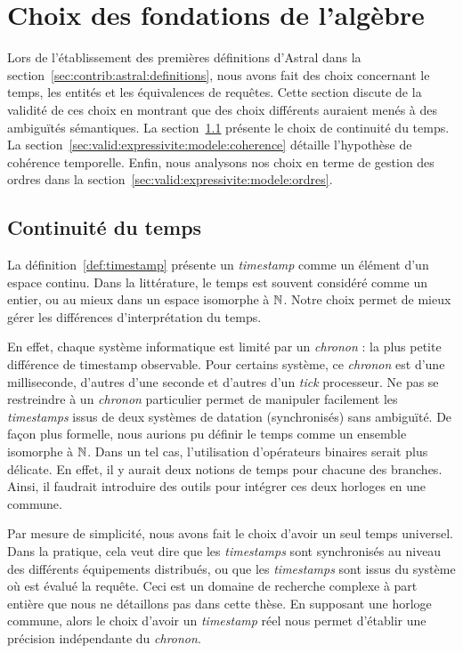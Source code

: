 \section{Choix des fondations de l'algèbre}\label{sec:valid:expressivite:modele}
Lors de l'établissement des premières définitions d'Astral dans la section~\ref{sec:contrib:astral:definitions}, nous avons fait des choix concernant le temps, les entités et les équivalences de requêtes. Cette section discute de la validité de ces choix en montrant que des choix différents auraient menés à des ambiguïtés sémantiques. La section~\ref{sec:valid:expressivite:modele:temps} présente le choix de continuité du temps. La section~\ref{sec:valid:expressivite:modele:coherence} détaille l'hypothèse de cohérence temporelle. Enfin, nous analysons nos choix en terme de gestion des ordres dans la section~\ref{sec:valid:expressivite:modele:ordres}.

\subsection{Continuité du temps}\label{sec:valid:expressivite:modele:temps}
La définition~\ref{def:timestamp} présente un \textit{timestamp} comme un élément d'un espace continu. Dans la littérature, le temps est souvent considéré comme un entier, ou au mieux dans un espace isomorphe à $\mathbb{N}$. Notre choix permet de mieux gérer les différences d'interprétation du temps.

En effet, chaque système informatique est limité par un \textit{chronon} : la plus petite différence de timestamp observable. Pour certains système, ce \textit{chronon} est d'une milliseconde, d'autres d'une seconde et d'autres d'un \textit{tick} processeur. Ne pas se restreindre à un \textit{chronon} particulier permet de manipuler facilement les \textit{timestamps} issus de deux systèmes de datation (synchronisés) sans ambiguïté. De façon plus formelle, nous aurions pu définir le temps comme un ensemble isomorphe à $\mathbb{N}$. Dans un tel cas, l'utilisation d'opérateurs binaires serait plus délicate. En effet, il y aurait deux notions de temps pour chacune des branches. Ainsi, il faudrait introduire des outils pour intégrer ces deux horloges en une commune.

Par mesure de simplicité, nous avons fait le choix d'avoir un seul temps universel. Dans la pratique, cela veut dire que les \textit{timestamps} sont synchronisés au niveau des différents équipements distribués, ou que les \textit{timestamps} sont issus du système où est évalué la requête. Ceci est un domaine de recherche complexe à part entière que nous ne détaillons pas dans cette thèse. En supposant une horloge commune, alors le choix d'avoir un \textit{timestamp} réel nous permet d'établir une précision indépendante du \textit{chronon}.

